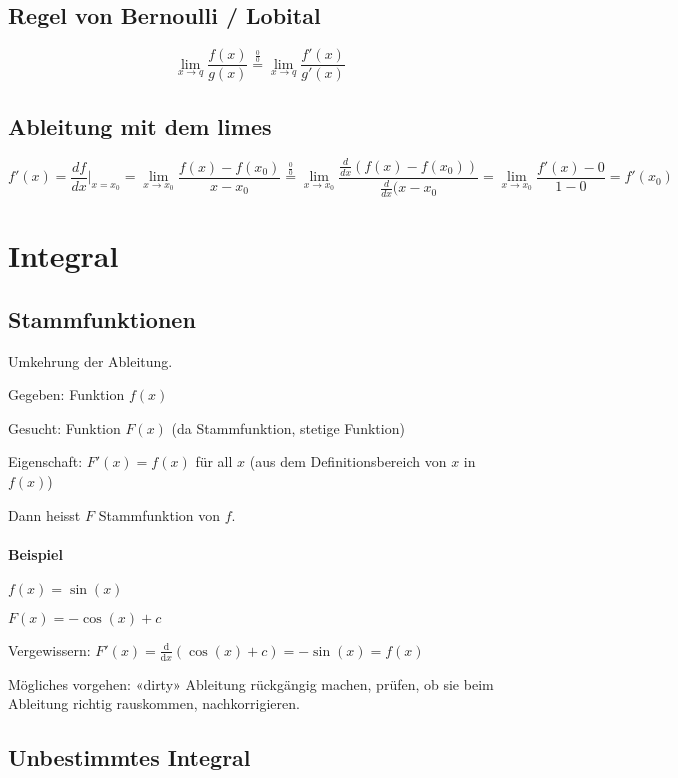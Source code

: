 \subsection{Regel von Bernoulli / Lobital}

\[
	\lim\limits_{x \to q} \frac{f(x)}{g(x)} \overset{\frac{0}{0}}{=} \lim\limits_{x \to q} \frac{f'(x)}{g'(x)}
\]


\subsection{Ableitung mit dem limes}

\[
	f'(x) = \frac{df}{dx}|_{x=x_0} = \lim\limits_{x \to x_0} \frac{f(x) - f(x_0)}{x - x_0} \overset{\frac{0}{0}}{=} \lim\limits_{x \to x_0} \frac{\frac{d}{dx}(f(x) - f(x_0))}{\frac{d}{dx}(x - x_0} = \lim\limits_{x \to x_0} \frac{f'(x) -0}{1 - 0} = f'(x_0)
\]

\section{Integral}

\subsection{Stammfunktionen}

Umkehrung der Ableitung.

Gegeben: Funktion $f(x)$

Gesucht: Funktion $F(x)$ (da Stammfunktion, stetige Funktion)

Eigenschaft: $F'(x) = f(x)$ für all $x$ (aus dem Definitionsbereich von $x$ in $f(x)$)

Dann heisst $F$ Stammfunktion von $f$.

\paragraph{Beispiel} \hfill

$f(x) = \sin(x)$

$F(x) = -\cos(x) + c$

Vergewissern: $F'(x) = \frac{\mathrm{d}}{\mathrm{d}x}(\cos(x) + c) = -\sin(x) = f(x)$

Mögliches vorgehen: «dirty» Ableitung rückgängig machen, prüfen, ob sie beim Ableitung richtig rauskommen, nachkorrigieren.

\subsection{Unbestimmtes Integral}


